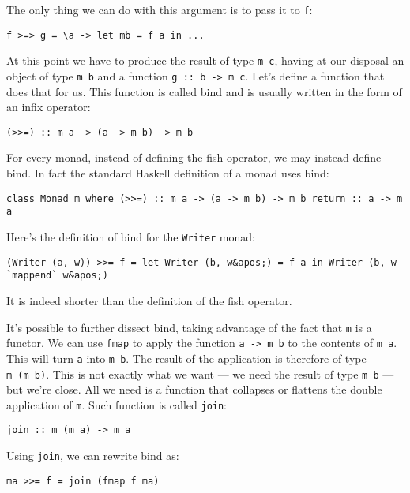 The only thing we can do with this argument is to pass it to \texttt{f}:

\begin{verbatim}
f >=> g = \a -> let mb = f a in ...
\end{verbatim}

At this point we have to produce the result of type \texttt{m\ c},
having at our disposal an object of type \texttt{m\ b} and a function
\texttt{g\ ::\ b\ -\textgreater{}\ m\ c}. Let's define a function that
does that for us. This function is called bind and is usually written in
the form of an infix operator:

\begin{verbatim}
(>>=) :: m a -> (a -> m b) -> m b
\end{verbatim}

For every monad, instead of defining the fish operator, we may instead
define bind. In fact the standard Haskell definition of a monad uses
bind:

\begin{verbatim}
class Monad m where (>>=) :: m a -> (a -> m b) -> m b return :: a -> m a
\end{verbatim}

Here's the definition of bind for the \texttt{Writer} monad:

\begin{verbatim}
(Writer (a, w)) >>= f = let Writer (b, w&apos;) = f a in Writer (b, w `mappend` w&apos;)
\end{verbatim}

It is indeed shorter than the definition of the fish operator.

It's possible to further dissect bind, taking advantage of the fact that
\texttt{m} is a functor. We can use \texttt{fmap} to apply the function
\texttt{a\ -\textgreater{}\ m\ b} to the contents of \texttt{m\ a}. This
will turn \texttt{a} into \texttt{m\ b}. The result of the application
is therefore of type \texttt{m\ (m\ b)}. This is not exactly what we
want --- we need the result of type \texttt{m\ b} --- but we're close.
All we need is a function that collapses or flattens the double
application of \texttt{m}. Such function is called \texttt{join}:

\begin{verbatim}
join :: m (m a) -> m a
\end{verbatim}

Using \texttt{join}, we can rewrite bind as:

\begin{verbatim}
ma >>= f = join (fmap f ma)
\end{verbatim}

